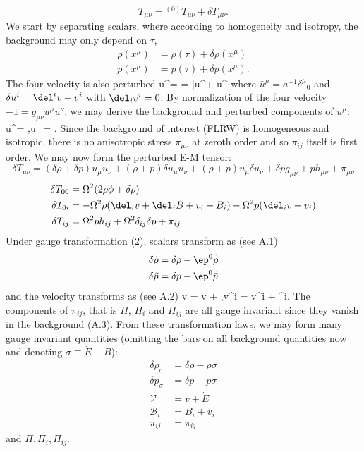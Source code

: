 \documentclass[10pt,letterpaper]{article}
\begin{document}
\[
	T_{\mu\nu} = {}^{(0)}T_{\mu\nu} + \delta T_{\mu\nu}.
\]
We start by separating scalars, where according to homogeneity and isotropy, the background may only depend on $\tau$, 
\begin{align}
	\rho(x^\mu) &= \bar \rho(\tau) + \delta \rho(x^\mu)\\
	p(x^\mu) &= \bar p(\tau) + \delta p(x^\mu).
\end{align}
The four velocity is also perturbed
\be
	u^\mu = = \bar u^\mu + \delta u^\mu
\ee
where $\bar u^\mu = a^{-1} \delta^\mu{}_0$ and $\delta u^i = \del^i v + v^i$ with $\del_i v^i = 0$. By normalization of the four velocity $-1 = g_{\mu\nu}u^\mu u^\nu$, we may derive the background and perturbed components of $u^\mu$:
\be
	u^\mu = ,\qquad u_\mu = \Omega{}.
\ee
Since the background of interest (FLRW) is homogeneous and isotropic, there is no anisotropic stress $\pi_{\mu\nu}$ at zeroth order and so $\pi_{ij}$ itself is first order. We may now form the perturbed E-M tensor:
\[
	\delta T_{\mu\nu} = (\delta\rho + \delta p)u_{\mu}u_\nu + (\rho+p)\delta u_\mu u_\nu + (\rho+p)u_\mu \delta u_\nu + \delta p g_{\mu\nu} + ph_{\mu\nu} +  \pi_{\mu\nu}
\]
\begin{align}
	\delta T_{00} &= \Omega^2(2\rho \phi + \delta \rho)\\
	\delta T_{0i} &= -\Omega^2\rho(\del_i v + \del_i B + v_i + B_i)-\Omega^2 p(\del_i v + v_i)\\
	\delta T_{ij} &= \Omega^2ph_{ij} + \Omega^2 \delta_{ij} \delta p + \pi_{ij}
\end{align}
Under gauge transformation (2), scalars transform as (see A.1)
\begin{align}
	\delta \tilde \rho &= \delta \rho - \ep^0 \dot{\bar\rho}\\
\delta \tilde p &= \delta p - \ep^0 \dot{\bar p}
\end{align}
and the velocity transforms as (see A.2)
\be
	\tilde v = v + \dot \ep,\quad \tilde v^i = v^i + \dot \ep^i.
\ee
The components of $\pi_{ij}$, that is $\Pi$, $\Pi_i$ and $\Pi_{ij}$ are all gauge invariant since they vanish in the background (A.3). From these transformation laws, we may form many gauge invariant quantities (omitting the bars on all background quantities now and denoting $\sigma \equiv \dot E-B$):
\begin{align}
	\delta \rho_\sigma &= \delta \rho - \dot\rho\sigma \\
	\delta p_\sigma &= \delta p - \dot p\sigma\\
	\mathcal V &= v+\dot E\\
	\mathcal B_i &= B_i + v_i\\
	\pi_{ij} &= \pi_{ij}
\end{align}
and $\Pi, \Pi_i, \Pi_{ij}$. 
\\ \\
\end{document}
